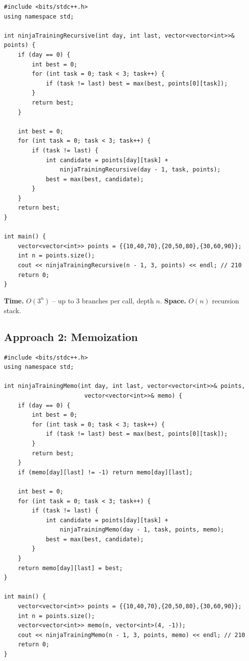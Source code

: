 \begin{lstlisting}
#include <bits/stdc++.h>
using namespace std;

int ninjaTrainingRecursive(int day, int last, vector<vector<int>>& points) {
    if (day == 0) {
        int best = 0;
        for (int task = 0; task < 3; task++) {
            if (task != last) best = max(best, points[0][task]);
        }
        return best;
    }

    int best = 0;
    for (int task = 0; task < 3; task++) {
        if (task != last) {
            int candidate = points[day][task] +
                ninjaTrainingRecursive(day - 1, task, points);
            best = max(best, candidate);
        }
    }
    return best;
}

int main() {
    vector<vector<int>> points = {{10,40,70},{20,50,80},{30,60,90}};
    int n = points.size();
    cout << ninjaTrainingRecursive(n - 1, 3, points) << endl; // 210
    return 0;
}
\end{lstlisting}

\begin{complexitybox}
\textbf{Time.} $O(3^n)$ -- up to $3$ branches per call, depth $n$.
\textbf{Space.} $O(n)$ recursion stack.
\end{complexitybox}

\subsection*{Approach 2: Memoization}

\begin{lstlisting}
#include <bits/stdc++.h>
using namespace std;

int ninjaTrainingMemo(int day, int last, vector<vector<int>>& points,
                       vector<vector<int>>& memo) {
    if (day == 0) {
        int best = 0;
        for (int task = 0; task < 3; task++) {
            if (task != last) best = max(best, points[0][task]);
        }
        return best;
    }
    if (memo[day][last] != -1) return memo[day][last];

    int best = 0;
    for (int task = 0; task < 3; task++) {
        if (task != last) {
            int candidate = points[day][task] +
                ninjaTrainingMemo(day - 1, task, points, memo);
            best = max(best, candidate);
        }
    }
    return memo[day][last] = best;
}

int main() {
    vector<vector<int>> points = {{10,40,70},{20,50,80},{30,60,90}};
    int n = points.size();
    vector<vector<int>> memo(n, vector<int>(4, -1));
    cout << ninjaTrainingMemo(n - 1, 3, points, memo) << endl; // 210
    return 0;
}
\end{lstlisting}

